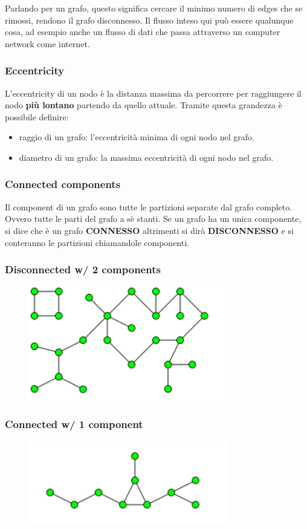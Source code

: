 Parlando per un grafo, questo significa cercare il minimo numero di edges che se rimossi, rendono il grafo disconnesso. Il flusso inteso qui può essere qualunque cosa, ad esempio anche un flusso di dati che passa attraverso un computer network come internet. 

\subsubsection*{Eccentricity}
L'eccentricity di un nodo è la distanza massima da percorrere per raggiungere il nodo \textbf{più lontano} partendo da quello attuale. Tramite questa grandezza è possibile definire: 
\begin{itemize}
    \item raggio di un grafo: l'eccentricità minima di ogni nodo nel grafo. 
    \item diametro di un grafo: la massima eccentricità di ogni nodo nel grafo. 
\end{itemize}
\subsubsection*{Connected components}
Il component di un grafo sono tutte le partizioni separate dal grafo completo. Ovvero tutte le parti del grafo a sè stanti. Se un grafo ha un unica componente, si dice che è un grafo \textbf{CONNESSO} altrimenti si dirà \textbf{DISCONNESSO} e si conteranno le partizioni chiamandole componenti. 
\newpage
\subsubsection*{Disconnected w/ 2 components}
\begin{figure}[th]
    \centering
    \includegraphics[scale=0.4]{Introduction/img/disconnected.png}
    \label{fig:disconnected}
\end{figure}
\subsubsection*{Connected w/ 1 component}
\begin{figure}[th]
    \centering
    \includegraphics[scale=0.4]{Introduction/img/connected.png}
    \label{fig:connected}
\end{figure}

